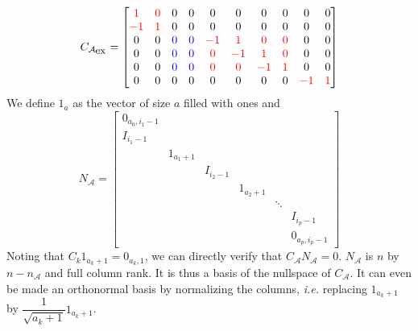\documentclass[]{article}
\newcommand{\BIN}{\begin{bmatrix}}
\newcommand{\BOUT}{\end{bmatrix}}
\newcommand{\cred}[1]{\textcolor{red}{#1}}
\newcommand{\cblue}[1]{\textcolor{blue}{#1}}
\begin{document}
\begin{equation}
C_{\mathcal{A}_{\mbox{\small ex}}} = \BIN                                           
   \cred{1} & \cred{0} & 0 & 0 &  0 &  0 &  0 & 0 &  0 & 0 \\
  \cred{-1} & \cred{1} & 0 & 0 &  0 &  0 &  0 & 0 &  0 & 0 \\
   0 & 0 & \cblue{0} & \cblue{0} & \cred{-1} & \cred{1} & \cred{0} & \cred{0} &  0 & 0 \\
   0 & 0 & \cblue{0} & \cblue{0} & \cred{0} & \cred{-1} & \cred{1} & \cred{0} &  0 & 0 \\
   0 & 0 & \cblue{0} & \cblue{0} & \cred{0} & \cred{0} & \cred{-1} & \cred{1} &  0 & 0 \\
   0 & 0 & 0 & 0 &  0 &  0 &  0 & 0 & \cred{-1} & \cred{1} \\
\BOUT
\end{equation}
We define $1_a$ as the vector of size $a$ filled with ones and
\begin{equation}
  N_{\mathcal{A}} = \BIN 
    0_{a_0,i_1-1} & & & & & \\
    I_{i_1-1} & & & & & \\
    & 1_{a_1+1} & & & & \\
    && I_{i_2-1} & & & \\
    &&& 1_{a_2+1} & & \\
    &&&&\ddots & \\
    &&&&& I_{i_p-1} \\
    &&&&& 0_{a_p,i_p-1}
  \BOUT
\end{equation}
Noting that $C_k 1_{a_k+1} = 0_{a_k,1}$, we can directly verify that $C_{\mathcal{A}} N_{\mathcal{A}} = 0$. $N_{\mathcal{A}}$ is $n$ by $n-n_{\mathcal{A}}$ and full column rank. It is thus a basis of the nullspace of $C_{\mathcal{A}}$. It can even be made an orthonormal basis by normalizing the columns, \emph{i.e.} replacing $1_{a_k+1}$ by $\dfrac{1}{\sqrt{a_k+1}}1_{a_k+1}$.
\end{document}
